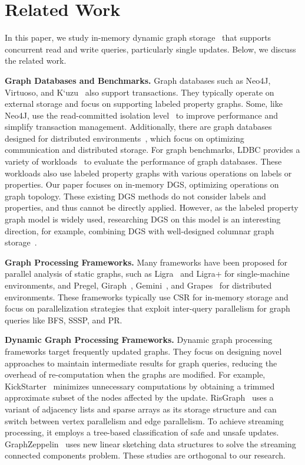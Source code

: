 \section{Related Work}
\label{sec:related_work}

In this paper, we study in-memory dynamic graph storage~\cite{macko2015llama, zhu2019livegraph, de2021teseo, dhulipala2019low, fuchs2022sortledton} that supports concurrent read and write queries, particularly single updates. Below, we discuss the related work.

\noindent\textbf{Graph Databases and Benchmarks.} Graph databases such as Neo4J, Virtuoso, and K`uzu~\cite{kuzu:cidr} also support transactions. They typically operate on external storage and focus on supporting labeled property graphs. Some, like Neo4J, use the read-committed isolation level~\cite{ramakrishnan2002database} to improve performance and simplify transaction management. Additionally, there are graph databases designed for distributed environments~\cite{li2022bytegraph,zhang2024bg3,besta2023graph,carter2019nanosecond}, which focus on optimizing communication and distributed storage. For graph benchmarks, LDBC provides a variety of workloads~\cite{erling2015ldbc,szarnyas2022ldbc,iosup2016ldbc} to evaluate the performance of graph databases. These workloads also use labeled property graphs with various operations on labels or properties. Our paper focuses on in-memory DGS, optimizing operations on graph topology. These existing DGS methods do not consider labels and properties, and thus cannot be directly applied. However, as the labeled property graph model is widely used, researching DGS on this model is an interesting direction, for example, combining DGS with well-designed columnar graph storage~\cite{mhedhbi2021a+}.

\noindent\textbf{Graph Processing Frameworks.} Many frameworks have been proposed for parallel analysis of static graphs, such as Ligra~\cite{shun2013ligra} and Ligra+\cite{shun2015smaller} for single-machine environments, and Pregel\cite{malewicz2010pregel}, Giraph~\cite{grover2015hadoop}, Gemini~\cite{zhu2016gemini}, and Grapes~\cite{fan2018parallelizing} for distributed environments. These frameworks typically use CSR for in-memory storage and focus on parallelization strategies that exploit inter-query parallelism for graph queries like BFS, SSSP, and PR.

\noindent\textbf{Dynamic Graph Processing Frameworks.} Dynamic graph processing frameworks target frequently updated graphs. They focus on designing novel approaches to maintain intermediate results for graph queries, reducing the overhead of re-computation when the graphs are modified. For example, KickStarter~\cite{vora2017kickstarter} minimizes unnecessary computations by obtaining a trimmed approximate subset of the nodes affected by the update. RisGraph~\cite{feng2021risgraph} uses a variant of adjacency lists and sparse arrays as its storage structure and can switch between vertex parallelism and edge parallelism. To achieve streaming processing, it employs a tree-based classification of safe and unsafe updates. GraphZeppelin~\cite{tench2022graphzeppelin} uses new linear sketching data structures to solve the streaming connected components problem. These studies are orthogonal to our research.
